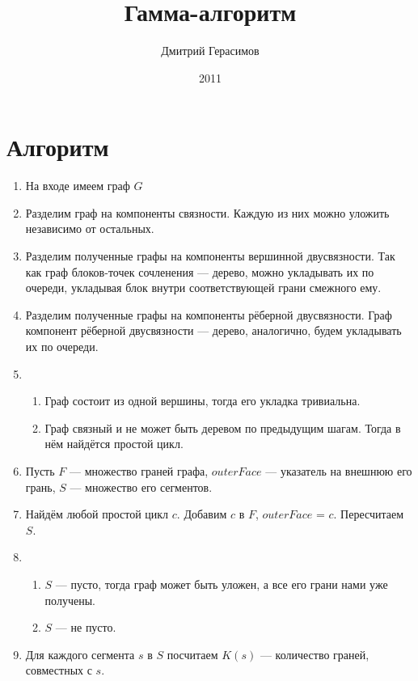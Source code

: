 \documentclass[a4paper, 10pt]{article}
\begin{document}
\title{Гамма-алгоритм}
\author{Дмитрий Герасимов}
\date{2011}

\maketitle
\tableofcontents

\section{Алгоритм}

\begin{enumerate}
    \item На входе имеем граф $G$
    \item Разделим граф на компоненты связности. Каждую из них
          можно уложить независимо от остальных.
    \item Разделим полученные графы на компоненты вершинной
          двусвязности. Так как граф блоков-точек сочленения — дерево,
          можно укладывать их по очереди, укладывая блок внутри соответствующей
          грани смежного ему.
    \item Разделим полученные графы на компоненты рёберной
          двусвязности. Граф компонент рёберной двусвязности — дерево,
          аналогично, будем укладывать их по очереди.
    \item 
          \begin{enumerate}
          \item Граф состоит из одной вершины, тогда его укладка тривиальна.
          \item Граф связный и не может быть деревом по предыдущим шагам.
                Тогда в нём найдётся простой цикл.
          \end{enumerate}
    \item Пусть $F$ — множество граней графа, $outerFace$ — указатель на внешнюю его грань, $S$ — множество его сегментов.
    \item Найдём любой простой цикл $c$. Добавим $c$ в $F$, $outerFace$ = $c$. Пересчитаем $S$.
    \item
          \begin{enumerate}
          \item $S$ — пусто, тогда граф может быть уложен, а все его грани нами уже получены.
          \item $S$ — не пусто.
          \end{enumerate}
    \item Для каждого сегмента $s$ в $S$ посчитаем $K(s)$ — количество граней, совместных с $s$.

\end{enumerate}
\end{document}
